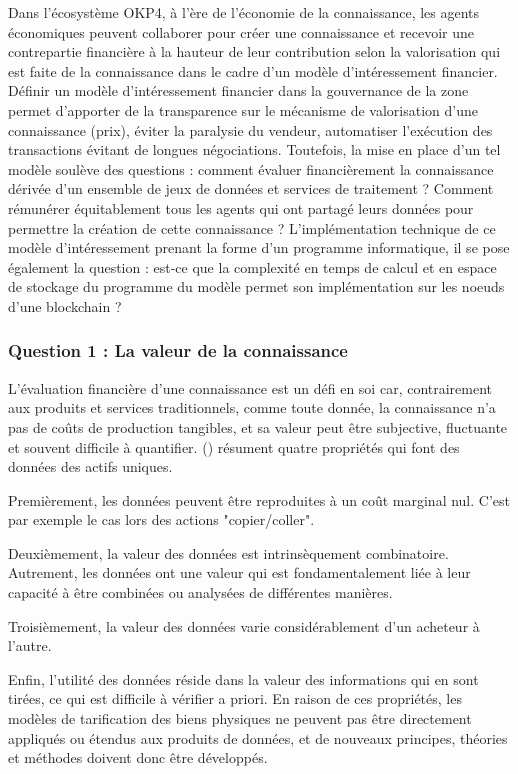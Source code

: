 Dans l'écosystème OKP4, à l'ère de l'économie de la connaissance, les agents économiques peuvent collaborer pour créer une connaissance et recevoir une contrepartie financière à la hauteur de leur contribution selon la valorisation qui est faite de la connaissance  dans le cadre d'un modèle d'intéressement financier. Définir un modèle d'intéressement financier dans la gouvernance de la zone permet d'apporter de la transparence sur le mécanisme de valorisation d'une connaissance (prix), éviter la paralysie du vendeur, automatiser l'exécution des transactions évitant de longues négociations. Toutefois, la mise en place d'un tel modèle soulève des questions :  comment évaluer financièrement la connaissance dérivée d'un ensemble de jeux de données et services de traitement ? Comment rémunérer équitablement tous les agents qui ont partagé leurs données pour permettre la création de cette connaissance ? L'implémentation technique de ce modèle d'intéressement prenant la forme d'un programme informatique, il se pose également la question : est-ce que la complexité en temps de calcul et en espace de stockage du programme du modèle permet son implémentation sur les noeuds d'une blockchain ?

\subsubsection{Question 1 : La valeur de la connaissance}\label{subsubsec:q1}

L'évaluation financière  d'une connaissance est un défi en soi car, contrairement aux produits et services traditionnels, comme toute donnée, la connaissance n'a pas de coûts de production tangibles, et sa valeur peut être subjective, fluctuante et souvent difficile à quantifier. \citeauthor{agarwal_marketplace_2019} (\citeyear{agarwal_marketplace_2019}) résument quatre propriétés qui font des données des actifs uniques. 

Premièrement, les données peuvent être reproduites à un coût marginal nul. C'est par exemple le cas lors des actions "copier/coller".

Deuxièmement, la valeur des données est intrinsèquement combinatoire. Autrement,  les données ont une valeur qui est fondamentalement liée à leur capacité à être combinées ou analysées de différentes manières. 

Troisièmement, la valeur des données varie considérablement d'un acheteur à l'autre.

Enfin, l'utilité des données réside dans la valeur des informations qui en sont tirées, ce qui est difficile à vérifier a priori. En raison de ces propriétés, les modèles de tarification des biens physiques ne peuvent pas être directement appliqués ou étendus aux produits de données, et de nouveaux principes, théories et méthodes doivent donc être développés.

